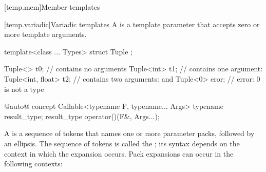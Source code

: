 \documentclass[american]{book}
\begin{document}
\begin{paras}
[temp.mem]{Member templates}

\setcounter{Paras}{9}
\pnum
{}

[temp.variadic]{Variadic templates}
\pnum
A \mbox{} is a template parameter
that accepts zero or more template arguments. \mbox{\enterexample}

\begin{codeblock}
template<class ... Types> struct Tuple { };

Tuple<> t0;             //  contains no arguments
Tuple<int> t1;          //  contains one argument: 
Tuple<int, float> t2;   //  contains two arguments:  and 
Tuple<0> eror;          // error: 0 is not a type
\end{codeblock}

\mbox{\exitexample}

 \color{addclr}
\begin{codeblock}
@\textcolor{addclr}{auto}@ concept Callable<typename F, typename... Args> {
  typename result_type;
  result_type operator()(F&, Args...);
}
\end{codeblock}
\color{black}\addedConcepts{\mbox{\exitexample\ \exitnote}}

\setcounter{Paras}{3}
\pnum
\textcolor{black}{A}  is a sequence of tokens that
names one or more parameter packs, followed by an ellipsis. The sequence
of tokens is called the ; its
syntax depends on the context in which the expansion occurs. Pack
expansions can occur in the following contexts:


\end{paras}
\end{document}
